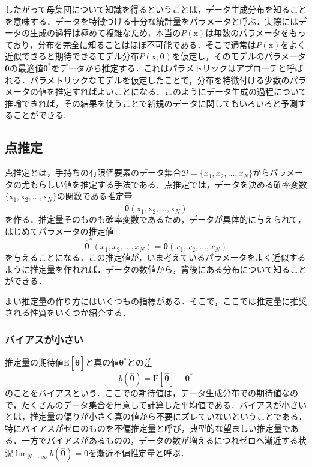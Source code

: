 \documentclass[a4paper,11pt]{jsreport}
\begin{document}
したがって母集団について知識を得るということは，データ生成分布を知ることを意味する．データを特徴づける十分な統計量をパラメータと呼ぶ．実際にはデータの生成の過程は極めて複雑なため，本当の$P(\mathrm{x})$は無数のパラメータをもっており，分布を完全に知ることはほぼ不可能である．そこで通常は$P(\mathrm{x})$をよく近似できると期待できるモデル分布$P(\mathrm{x};\bm{\theta})$を仮定し，そのモデルのパラメータ$\bm{\theta}$の最適値$\bm{\theta}^*$をデータから推定する．これはパラメトリックはアプローチと呼ばれる．パラメトリックなモデルを仮定したことで，分布を特徴付ける少数のパラメータの値を推定すればよいことになる．このようにデータ生成の過程について推論できれば，その結果を使うことで新規のデータに関してもいろいろと予測することができる.
\subsection{点推定}
点推定とは，手持ちの有限個要素のデータ集合$\mathcal{D} = \{ x_1, x_2,\dots, x_N \}$からパラメータの尤もらしい値を推定する手法である．点推定では，データを決める確率変数$\{ \mathrm{x}_1, \mathrm{x}_2, \dots, \mathrm{x}_N \}$の関数である推定量
\begin{equation}
  \hat{\bm{\theta}}( \mathrm{x}_1, \mathrm{x}_2, \dots, \mathrm{x}_N )
\end{equation}
を作る．推定量そのものも確率変数であるため，データが具体的に与えられて，はじめてパラメータの推定値
\begin{equation}
  \hat{\bm{\theta}}^*( x_1, x_2, \dots, x_N )
  =\hat{\bm{\theta}}( x_1, x_2, \dots, x_N )
\end{equation}
を与えることになる．この推定値が，いま考えているパラメータをよく近似するように推定量を作れれば．データの数値から，背後にある分布について知ることができる．\par
よい推定量の作り方にはいくつもの指標がある．そこで，ここでは推定量に推奨される性質をいくつか紹介する．

\subsubsection*{バイアスが小さい}
推定量の期待値$\mathrm{E} \left[ \hat{\bm{\theta}} \right]$と真の値$\bm{\theta}^*$との差
\begin{equation}
  b(\hat{\bm{\theta}})
  = \mathrm{E} \left[ \hat{\bm{\theta}} \right] - \bm{\theta}^*
\end{equation}
のことをバイアスという．ここでの期待値は，データ生成分布での期待値なので，たくさんのデータ集合を用意して計算した平均値である．バイアスが小さいとは，推定量の偏りが小さく真の値から不要にズレていないということである．特にバイアスがゼロのものを不偏推定量と呼び，典型的な望ましい推定量である．一方でバイアスがあるものの，データの数が増えるにつれゼロへ漸近する状況$\lim_{N \rightarrow \infty} b(\hat{\bm{\theta}}) = 0$を漸近不偏推定量と呼ぶ．
\end{document}
